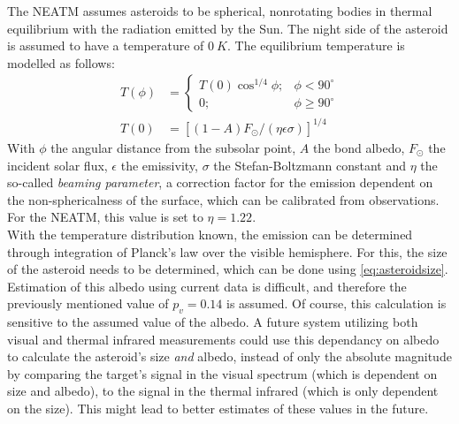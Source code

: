 The NEATM assumes asteroids to be spherical, nonrotating bodies in thermal equilibrium with the radiation emitted by the Sun. The night side of the asteroid is assumed to have a temperature of $0~K$. The equilibrium temperature is modelled as follows:
\begin{align}
 T(\phi) &= \begin{cases}
            T(0) \cos ^{1/4} \phi;& \phi < 90^\circ \\
            0;& \phi \geq 90^\circ
           \end{cases} \\
T(0) &= \left[(1-A)F_{\odot}/(\eta \epsilon \sigma)\right]^{1/4}
\end{align}
With $\phi$ the angular distance from the subsolar point, $A$ the bond albedo, $F_{\odot}$ the incident solar flux, $\epsilon$ the emissivity, $\sigma$ the Stefan-Boltzmann constant and $\eta$ the so-called \textit{beaming parameter}, a correction factor for the emission dependent on the non-sphericalness of the surface, which can be calibrated from observations. For the NEATM, this value is set to $\eta = 1.22$.\\

With the temperature distribution known, the emission can be determined through integration of Planck's law over the visible hemisphere. For this, the size of the asteroid needs to be determined, which can be done using \autoref{eq:asteroidsize}. Estimation of this albedo using current data is difficult, and therefore the previously mentioned value of $p_v = 0.14$ is assumed. Of course, this calculation is sensitive to the assumed value of the albedo. A future system utilizing both visual and thermal infrared measurements could use this dependancy on albedo to calculate the asteroid's size \textit{and} albedo, instead of only the absolute magnitude by comparing the target's signal in the visual spectrum (which is dependent on size and albedo), to the signal in the thermal infrared (which is only dependent on the size). This might lead to better estimates of these values in the future.\\

